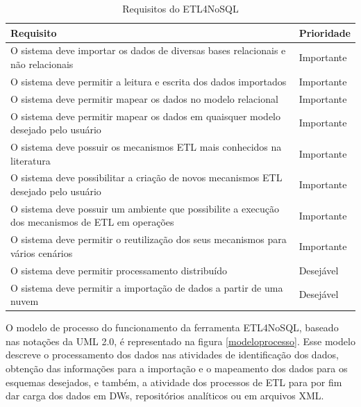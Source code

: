 \begin{table}[h]
	\centering
	\caption{Requisitos do ETL4NoSQL}
	\label{requisitos}
	\begin{tabular}{|p{11cm}| p{2cm} |}
		\hline
		Requisito & Prioridade\\
		\hline
		O sistema deve importar os dados de diversas bases relacionais e não relacionais & Importante\\
		\hline
		O sistema deve permitir a leitura e escrita dos dados importados & Importante\\
		\hline
		O sistema deve permitir mapear os dados no modelo relacional & Importante\\
		\hline
		O sistema deve permitir mapear os dados em quaisquer modelo desejado pelo usuário & Importante\\
		\hline
		O sistema deve possuir os mecanismos ETL mais conhecidos na literatura & Importante\\
		\hline
		O sistema deve possibilitar a criação de novos mecanismos ETL desejado pelo usuário & Importante\\
		\hline
		O sistema deve possuir um ambiente que possibilite a execução dos mecanismos de ETL em operações & Importante\\
		\hline
		O sistema deve permitir o reutilização dos seus mecanismos para vários cenários & Importante\\
		\hline
		O sistema deve permitir processamento distribuído & Desejável\\
		\hline
		O sistema deve permitir a importação de dados a partir de uma nuvem & Desejável\\
		\hline
		
		
	\end{tabular}
\end{table}

O modelo de processo do funcionamento da ferramenta ETL4NoSQL, baseado nas notações da UML 2.0, é representado na figura \ref{modeloprocesso}. Esse modelo descreve o processamento dos dados nas atividades de identificação dos dados, obtenção das informações para a importação e o mapeamento dos dados para os esquemas desejados, e também, a atividade dos processos de ETL para por fim dar carga dos dados em DWs, repositórios analíticos ou em arquivos XML.

